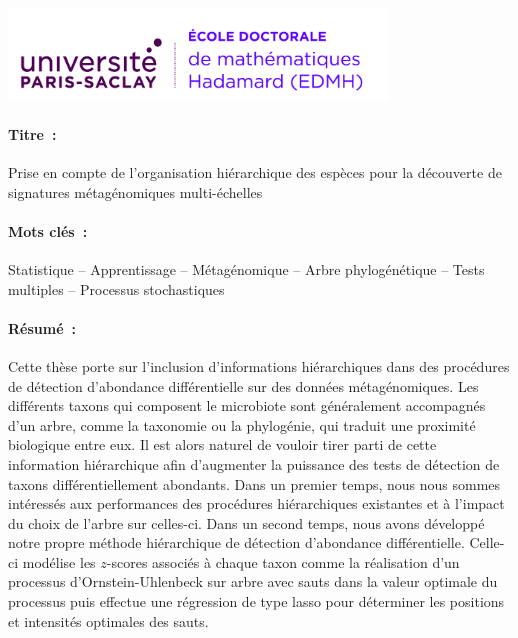 \documentclass[12pt,a4paper]{reedthesis}
\theoremstyle{definition}
\theoremstyle{definition}
\theoremstyle{definition}
\theoremstyle{remark}
\begin{document}
\noindent
\includegraphics[height=2.45cm]{logos/edmh.jpg}
\vspace{1cm}
\begin{mdframed}[linecolor=Prune,linewidth=1]
\vspace{-.25cm}
\paragraph*{Titre~:} Prise en compte de l'organisation hiérarchique des espèces pour la découverte de signatures métagénomiques multi-échelles
\begin{small}
\vspace{-.25cm}
\paragraph*{Mots clés~:} Statistique -- Apprentissage -- Métagénomique -- Arbre phylogénétique -- Tests multiples -- Processus stochastiques

\vspace{-.5cm}
\begin{multicols}{2}
\paragraph*{Résumé~:} Cette thèse porte sur l'inclusion d'informations hiérarchiques dans des procédures
de détection d'abondance différentielle sur des données métagénomiques. Les différents
taxons qui composent le microbiote sont généralement accompagnés d'un arbre, comme la
taxonomie ou la phylogénie, qui traduit une proximité biologique entre eux.
Il est alors naturel de vouloir tirer parti de cette information hiérarchique afin
d'augmenter la puissance des tests de détection de taxons différentiellement
abondants. Dans un premier temps, nous nous sommes intéressés aux performances des
procédures hiérarchiques existantes et à l'impact du choix de l'arbre sur celles-ci.
Dans un second temps, nous avons développé notre propre méthode hiérarchique de
détection d'abondance différentielle. Celle-ci modélise les \(z\)-scores associés
à chaque taxon comme la réalisation d'un processus d'Ornstein-Uhlenbeck sur arbre
avec sauts dans la valeur optimale du processus puis effectue une régression de type lasso
pour déterminer les positions et intensités optimales des sauts.
\end{multicols}
\end{small}
\end{mdframed}
\end{document}
